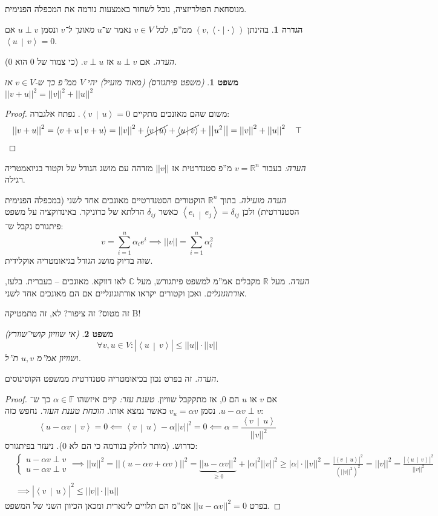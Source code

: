 \documentclass[]{article}
\newcommand\R     {\mathbb{R}}
\newcommand\C     {\mathbb{C}}
\newcommand\ra    {\rangle}
\newcommand\la    {\langle}
\newcommand\F         {\mathbb{F}}
\newcommand\co        {\colon}
\newcommand\ag        {\alpha}
\newcommand\dequad    {\!\!\!\!\!\!}
\newtheorem{Theorem}{משפט}
\theoremstyle{definition}
\newtheorem{definition}{הגדרה}
\newcommand\theo  [1] {\begin{Theorem}#1\end{Theorem}}
\newcommand\defi  [1] {\begin{definition}#1\end{definition}}
\newcommand\norm[1]   {\left \vert \left \vert #1 \right \vert \right \vert}
\newcommand\smut      {\left \la \cdot \mid \cdot \right \ra}
\newcommand\mut[2]    {\left \la #1 \,\middle\vert\, #2 \right \ra}
\begin{document}
    מנוסחאת הפולריזציה, נוכל לשחזר באמצעות נורמה את המכפלה הפנימית. 
    
    \defi{בהינתן $(v, \smut)$ ממ''פ, לכל $v \in V$ נאמר ש־$u$ \textit{מאונך ל־$v$} ונסמן $u\perp v$ אם $\mut{u}{v} = 0$. }
    
    \textit{הערה. }אם $u \perp v$ אז $v \perp u$. (כי צמוד של $0$ הוא $0$). 
    
    \theo{(משפט פיתגורס) (מאוד מועיל) יהי $V$ ממ''פ כך ש-$v \in V$ אז $\norm{v + u}^2 = \norm{v}^2 + \norm{u}^2$}\begin{proof} משום שהם מאונכים מתקיים $\mut{v}{u} = 0$. נפתח אלגברה: 
        \[ \norm{v + u}^2 = \mut{v + u}{v + u} = \norm{v}^2 + \cancel{\mut{v}{u}} + \cancel{\mut{u}{v}} + \norm{u^2} = \norm{v}^2 + \norm{u}^2 \quad \top \]
    \end{proof}
    
    \textit{הערה: }בעבור $v = \R^n$ מ''פ סטנדרטית אז $\norm{v}$ מזדהה עם מושג הגודל של וקטור בגיואמטריה רגילה. 
    
    \textit{הערה מועילה. }בתוך $\R^n$ הוקטורים הסטנדרטיים מאונכים אחד לשני (במכפלה הפנימית הסטנדרטית) ולכן $\mut{e_i}{e_j} = \delta_{ij}$ כאשר $\delta_{ij}$ הדלתא של כרוניקר. באינדוקציה על משפט פיתגורס נקבל ש־: 
    \[ v = \sum_{i = 1}^{n}\ag_i e^i \implies \norm{v} = \sum_{i = 1}^{n}\ag_i^2 \]
    שזה בדיוק מושג הגודל בגיאומטריה אוקלידית. 
    
   \textit{הערה. }מעל $\R$ מקבלים אמ''מ למשפט פיתגורש, מעל $\C$ לאו דווקא. מאונכים – בעברית. בלעז, \textit{אורתוגונלים}. ואכן וקטורים יקראו אורתוגונליים אם הם מאונכים אחד לשני. 
   
   זה מטוס? זה ציפור? לא, זה מתמטיקה B!
   \theo{(אי שוויון קושי־שוורץ)
   \[ \forall v, u \in V \co |\mut{u}{v}| \le \norm{u}\cdot\norm{v} \]
   ושוויון אמ''מ $u, v$ ת''ל. }
   \textit{הערה. }זה בפרט נכון בכיאומטריה סטנדרטית ממשפט הקוסינוסים. 
   
   \begin{proof}
       אם $v$ או $u$ הם $0$, אז מתקקבל שוויון. 
       \textit{טענת עזר: }קיים איזשהו $\ag \in \F$ כך ש־$u - \ag v \perp v$. נסמן $v_u = \ag v$ כאשר נמצא אותו. 
       \textit{הוכחת טענת העזר. }נחפש כזה: 
       \[ \mut{u - \ag v}{v} = 0 \impliedby \mut{v}{u} - \ag \norm{v}^2 = 0 \impliedby \ag = \frac{\mut{v}{u}}{\norm{v}^2} \]
       כדרוש. (מותר לחלק בנורמה כי הם לא $0$). ניעזר בפיתגורס: 
       \begin{align*}
           &\begin{cases}
               u - \ag v \perp v \\ u - \ag v \perp v
           \end{cases}\dequad \implies \norm{u}^2 = \norm{(u - \ag v + \ag v)}^2 = \underbrace{\norm{u - \ag v}^2}_{\ge 0} + |\ag|^2\norm{v}^2 \ge |\ag|\cdot\norm{v}^2 = \frac{|\mut{v}{u}|^2}{(\norm{v}^2)^2} = \norm{v}^2 = \frac{|\mut{u}{v}|^2}{\norm{v}^2} \\ &\implies |\mut{v}{u}|^2 \le \norm{v} \cdot \norm{u}
       \end{align*}
       בפרט $\norm{u - \ag v}^2 = 0$ אמ''מ הם תלויים לינארית ומכאן הכיוון השני של המשפט. 
   \end{proof}
   
\end{document}
